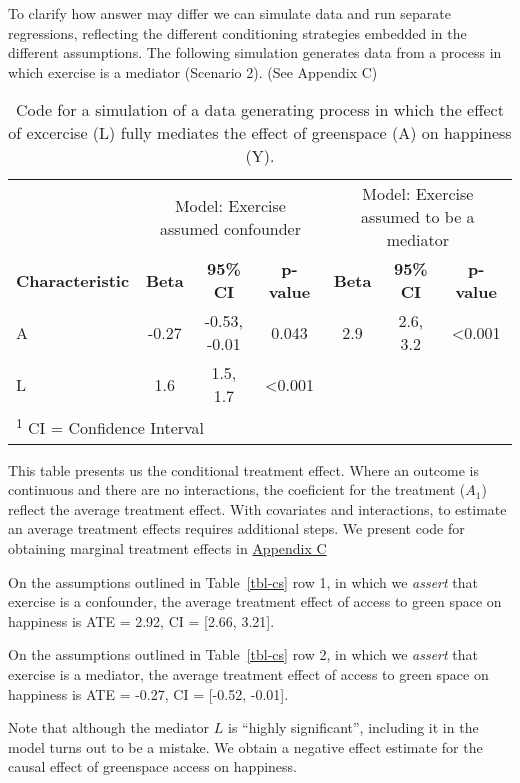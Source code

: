 \documentclass[
  singlecolumn]{article}
\begin{document}
To clarify how answer may differ we can simulate data and run separate
regressions, reflecting the different conditioning strategies embedded
in the different assumptions. The following simulation generates data
from a process in which exercise is a mediator (Scenario 2). (See
Appendix C)

\begin{table}
\caption{Code for a simulation of a data generating process in which the effect
of excercise (L) fully mediates the effect of greenspace (A) on
happiness (Y).}\tabularnewline

\centering
\begin{tabular}{lcccccc}
\toprule
\multicolumn{1}{c}{ } & \multicolumn{3}{c}{Model: Exercise assumed confounder} & \multicolumn{3}{c}{Model: Exercise assumed to be a mediator} \\
\cmidrule(l{3pt}r{3pt}){2-4} \cmidrule(l{3pt}r{3pt}){5-7}
\textbf{Characteristic} & \textbf{Beta} & \textbf{95\% CI} & \textbf{p-value} & \textbf{Beta} & \textbf{95\% CI} & \textbf{p-value}\\
\midrule
A & -0.27 & -0.53, -0.01 & 0.043 & 2.9 & 2.6, 3.2 & <0.001\\
L & 1.6 & 1.5, 1.7 & <0.001 &  &  & \\
\bottomrule
\multicolumn{7}{l}{\rule{0pt}{1em}\textsuperscript{1} CI = Confidence Interval}\\
\end{tabular}
\end{table}

This table presents us the conditional treatment effect. Where an
outcome is continuous and there are no interactions, the coeficient for
the treatment (\(A_1\)) reflect the average treatment effect. With
covariates and interactions, to estimate an average treatment effects
requires additional steps. We present code for obtaining marginal
treatment effects in \hyperref[appendix-c]{Appendix C}

On the assumptions outlined in Table~\ref{tbl-cs} row 1, in which we
\emph{assert} that exercise is a confounder, the average treatment
effect of access to green space on happiness is ATE = 2.92, CI =
{[}2.66, 3.21{]}.

On the assumptions outlined in Table~\ref{tbl-cs} row 2, in which we
\emph{assert} that exercise is a mediator, the average treatment effect
of access to green space on happiness is ATE = -0.27, CI = {[}-0.52,
-0.01{]}.

Note that although the mediator \(L\) is ``highly significant'',
including it in the model turns out to be a mistake. We obtain a
negative effect estimate for the causal effect of greenspace access on
happiness.
\end{document}

